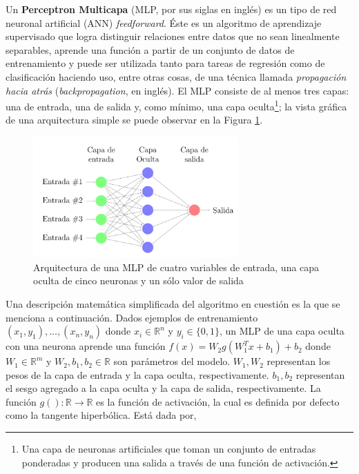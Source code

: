     \par Un \textbf{Perceptron Multicapa} (MLP, por sus siglas en inglés)\cite{mlp_intro1, mlp_intro2} es un tipo
      de red neuronal artificial (ANN) \textit{feedforward}.
      Éste es un algoritmo de aprendizaje supervisado que logra distinguir
      relaciones entre datos que no sean linealmente separables, aprende una función
      a partir de un conjunto de datos de entrenamiento y puede ser
      utilizada tanto para tareas de regresión como de clasificación haciendo uso, entre
      otras cosas, de una técnica llamada \textit{propagación hacia atrás}\cite{backpropagation}
      (\textit{backpropagation}, en inglés).
      El MLP consiste de al menos tres capas: una de entrada, una de salida y,
      como mínimo, una capa oculta\footnote{Una capa de neuronas artificiales que toman un conjunto
      de entradas ponderadas y producen una salida a través de una función de activación.};
      la vista gráfica de una arquitectura simple se puede observar en la
      Figura \ref{fig:mlp_ejemplo}.
      \begin{figure}
      \centering%
      \includegraphics[width=0.7\textwidth]{images/ejemplo_mlp}%
      \caption{Arquitectura de una MLP de cuatro variables de entrada, una capa
              oculta de cinco neuronas y un sólo valor de salida}\label{fig:mlp_ejemplo}
      \end{figure}

    \par Una descripción matemática simplificada del algoritmo en cuestión es la
      que se menciona a continuación.
      Dados ejemplos de entrenamiento $(x_{1}, y_{1}), \dots, (x_{n}, y_{n})$
      donde $x_{i} \in \mathbb{R}^{n}$ y $y_{i} \in \{0,1\}$, un MLP de una capa oculta
      con una neurona aprende una función $f(x) = W_{2}g(W_{1}^{T} x + b_{1}) + b_{2}$
      donde $W_{1} \in \mathbb{R}^{m}$ y $W_{2}, b_{1}, b_{2} \in \mathbb{R}$ son
      parámetros del modelo. $W_{1}, W_{2}$ representan los pesos de la capa de entrada y la
      capa oculta, respectivamente. $b_{1}, b_{2}$ representan el sesgo agregado a
      la capa oculta y la capa de salida, respectivamente. La función
      $g(): \mathbb{R} \rightarrow \mathbb{R}$ es la función de activación, la cual
      es definida por defecto como la tangente hiperbólica. Está dada por,

